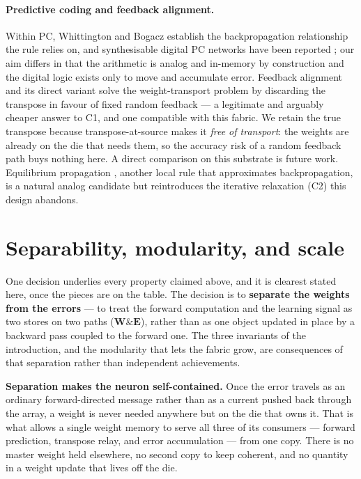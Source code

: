 \documentclass[11pt]{article}
\begin{document}
\hypertarget{predictive-coding-and-feedback-alignment.}{%
\paragraph{Predictive coding and feedback
alignment.}\label{predictive-coding-and-feedback-alignment.}}

Within PC, Whittington and Bogacz \cite{whittington2017approximation}
establish the backpropagation relationship the rule relies on, and
synthesisable digital PC networks have been reported
\cite{oh2026synthesizable}; our aim differs in that the arithmetic is
analog and in-memory by construction and the digital logic exists only
to move and accumulate error. Feedback alignment and its direct variant
\cite{lillicrap2016random, nokland2016direct} solve the
weight-transport problem by discarding the transpose in favour of fixed
random feedback --- a legitimate and arguably cheaper answer to C1, and
one compatible with this fabric. We retain the true transpose because
transpose-at-source makes it \emph{free of transport}: the weights are
already on the die that needs them, so the accuracy risk of a random
feedback path buys nothing here. A direct comparison on this substrate
is future work. Equilibrium propagation \cite{scellier2017equilibrium},
another local rule that approximates backpropagation, is a natural
analog candidate but reintroduces the iterative relaxation (C2) this
design abandons.

\hypertarget{sec:scale}{%
\section{Separability, modularity, and scale}\label{sec:scale}}

One decision underlies every property claimed above, and it is clearest
stated here, once the pieces are on the table. The decision is to
\textbf{separate the weights from the errors} --- to treat the forward
computation and the learning signal as two stores on two paths
(\(\bm W\&\bm E\)), rather than as one object updated in place by a
backward pass coupled to the forward one. The three invariants of the
introduction, and the modularity that lets the fabric grow, are
consequences of that separation rather than independent achievements.

\textbf{Separation makes the neuron self-contained.} Once the error
travels as an ordinary forward-directed message rather than as a current
pushed back through the array, a weight is never needed anywhere but on
the die that owns it. That is what allows a single weight memory to
serve all three of its consumers --- forward prediction, transpose
relay, and error accumulation --- from one copy. There is no master
weight held elsewhere, no second copy to keep coherent, and no quantity
in a weight update that lives off the die.
\end{document}
